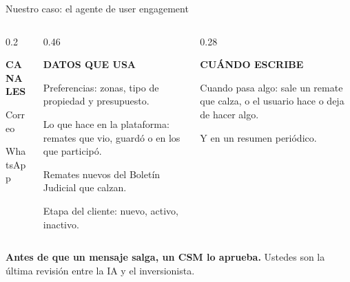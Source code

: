 \documentclass[aspectratio=169,10pt]{beamer}
\begin{document}
\begin{frame}{Nuestro caso: el agente de user engagement}
\vspace{0.15cm}
\begin{columns}[T,onlytextwidth]
\begin{column}{0.2\textwidth}
\begin{caja}
{\scriptsize\bfseries\color{mitRojo}CANALES\par}\vspace{4pt}
\small Correo\par WhatsApp
\end{caja}
\end{column}
\begin{column}{0.46\textwidth}
\begin{caja}
{\scriptsize\bfseries\color{mitRojo}DATOS QUE USA\par}\vspace{4pt}
\footnotesize
Preferencias: zonas, tipo de propiedad y presupuesto.\par
Lo que hace en la plataforma: remates que vio, guardó o en los que
participó.\par
Remates nuevos del Boletín Judicial que calzan.\par
Etapa del cliente: nuevo, activo, inactivo.
\end{caja}
\end{column}
\begin{column}{0.28\textwidth}
\begin{caja}
{\scriptsize\bfseries\color{mitRojo}CUÁNDO ESCRIBE\par}\vspace{4pt}
\footnotesize Cuando pasa algo: sale un remate que calza, o el usuario hace o deja
de hacer algo.\par
Y en un resumen periódico.
\end{caja}
\end{column}
\end{columns}

\vspace{0.3cm}
\begin{destacado}
\textbf{Antes de que un mensaje salga, un CSM lo aprueba.} Ustedes son la
última revisión entre la IA y el inversionista.
\end{destacado}
\end{frame}
\end{document}
